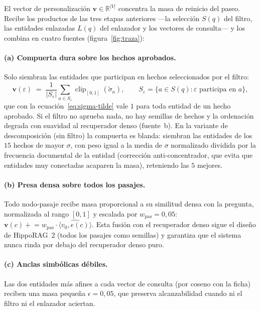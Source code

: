 \documentclass[11pt,a4paper]{article}
\newcommand{\hippo}{HippoRAG~2}
\newcommand{\op}[1]{\operatorname{#1}}
\newcommand{\R}{\mathbb{R}}
\begin{document}
El vector de personalización $\mathbf{v}\in\R^{|V|}$ concentra la masa de
reinicio del paseo. Recibe los productos de las tres etapas anteriores
---la selección $S(q)$ del filtro, las entidades enlazadas $L(q)$ del
enlazador y los vectores de consulta--- y los combina en cuatro fuentes
(figura~\ref{fig:traza}):

\paragraph{(a) Compuerta dura sobre los hechos aprobados.}
Solo siembran las entidades que participan en hechos seleccionados por el
filtro:
\begin{equation}
\mathbf{v}(\varepsilon) \;=\;
\frac{1}{|S_\varepsilon|}\sum_{a\in S_\varepsilon}
\op{clip}_{[0,1]}(\tilde{\sigma}_a),
\qquad
S_\varepsilon = \{a \in S(q) : \varepsilon \text{ participa en } a\},
\label{eq:compuerta}
\end{equation}
que con la ecuación~\eqref{eq:sigma-tilde} vale $1$ para toda entidad de un
hecho aprobado. Si el filtro no aprueba nada, no hay semillas de hechos y la
ordenación degrada con suavidad al recuperador denso (fuente~b). En la
variante de descomposición (sin filtro) la compuerta es blanda: siembran las
entidades de los $15$ hechos de mayor $\sigma$, con peso igual a la media de
$\sigma$ normalizado dividida por la frecuencia documental de la entidad
(corrección anti-concentrador, que evita que entidades muy conectadas
acaparen la masa), reteniendo las $5$ mejores.

\paragraph{(b) Presa densa sobre todos los pasajes.}
Todo nodo-pasaje recibe masa proporcional a su similitud densa con la
pregunta, normalizada al rango $[0,1]$ y escalada por
$w_{\text{pas}} = 0{,}05$:
$\mathbf{v}(c) \mathrel{+}= w_{\text{pas}}\cdot
\widehat{\langle v_0, e(c)\rangle}$. Esta fusión con el recuperador denso
sigue el diseño de \hippo{} (todos los pasajes como semillas) y garantiza
que el sistema nunca rinda por debajo del recuperador denso puro.

\paragraph{(c) Anclas simbólicas débiles.}
Las dos entidades más afines a cada vector de consulta (por coseno con la
ficha) reciben una masa pequeña $\epsilon = 0{,}05$, que preserva
alcanzabilidad cuando ni el filtro ni el enlazador aciertan.
\end{document}
